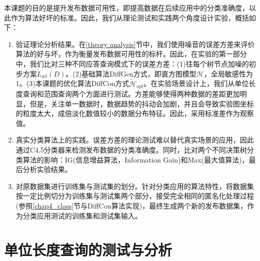 本课题的目的是提升发布数据可用性，即提高数据在后续应用中的分类准确度，以此作为算法好坏的标准。因此，我们从理论测试和实践两个角度设计实验，概括如下：
\begin{enumerate}
	\item 验证理论分析结果。在\ref{theory analysis}节中，我们使用噪音的误差方差来评价算法的好与坏，作为衡量发布数据可用性的标杆。因此，在实验的第一部分中，我们比对三种不同应答查询模式下的误差方差：(1)往每个树节点加噪的初步方案$\tilde{L}_{all}(D)$。(2)基础算法DiffGen方式，即直方图模型$\mathcal{H}$，全局敏感性为1。(3)本课题的优化算法DiffCon方式$\tilde{\mathcal{H}}_{opt}$。在实验场景设计上，我们从单位长度查询和范围查询两个方面进行测试。方差能够使得两种数据的差距更加明显，但是，关注单一数据时，数据趋势的抖动会加剧，并且会导致实验图坐标的粒度太大，成倍淡化数值较小的数据分布特征。因此，采用标准差作为观察值。
	\item 真实分类算法上的实践。误差方差的理论测试难以替代真实场景的应用，因此通过C4.5分类器\cite{C45}来检测发布数据的分类准确度。同时，比对两个不同决策树分类算法的影响：IG(信息增益算法，Information Gain)和Max\cite{max}(最大值算法)，最后分析实验结果。
	\item 对原数据集进行训练集与测试集的划分。针对分类应用的算法特性，将数据集按一定比例切分为训练集与测试集两个部分，接受完全相同的匿名化处理过程(参照\ref{chap4_class}节与DiffCon算法实现)，最终生成两个新的发布数据集，作为分类应用测试的训练集和测试集输入。
\end{enumerate}	

\section{单位长度查询的测试与分析} 
